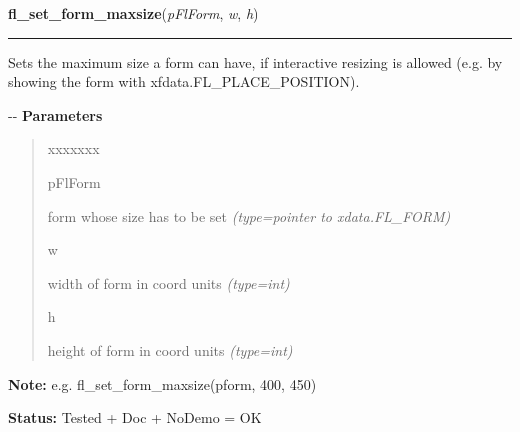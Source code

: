 \hspace{.8\funcindent}\begin{boxedminipage}{\funcwidth}

    \raggedright \textbf{fl\_set\_form\_maxsize}(\textit{pFlForm}, \textit{w}, \textit{h})

    \vspace{-1.5ex}

    \rule{\textwidth}{0.5\fboxrule}
\setlength{\parskip}{2ex}

Sets the maximum size a form can have, if interactive resizing is
allowed (e.g. by showing the form with xfdata.FL\_PLACE\_POSITION).

-{}-
\setlength{\parskip}{1ex}
      \textbf{Parameters}
      \vspace{-1ex}

      \begin{quote}
        \begin{Ventry}{xxxxxxx}

          \item[pFlForm]


form whose size has to be set
            {\it (type=pointer to xdata.FL\_FORM)}

          \item[w]


width of form in coord units
            {\it (type=int)}

          \item[h]


height of form in coord units
            {\it (type=int)}

        \end{Ventry}

      \end{quote}

\textbf{Note:} 
e.g. fl\_set\_form\_maxsize(pform, 400, 450)


\textbf{Status:} 
Tested + Doc + NoDemo = OK


    \end{boxedminipage}

    \label{xformslib:flbasic:fl_set_form_event_cmask}

    \vspace{0.5ex}

